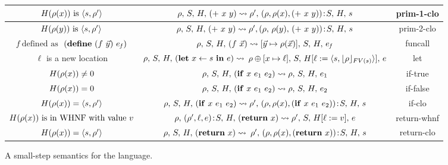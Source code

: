 \documentclass[9pt,preprint,nonatbib]{sigplanconf}
\def\myvec{\mathaccent"017E }
\begin{document}
\begin{figure}[t!]
\begin{center}
\begin{tabular}{|c|c|c|}
$H(\rho(x)) \mbox{ is } \langle s, \rho'\rangle$ & $\rho,\, S,\, H,\, (+~x~y)
\rightsquigarrow
\rho',\, (\rho, \rho(x), (+~x~y))\!:\!S,\, H,\, s$      &
{\sc prim-1-clo} \\
\hline
$H(\rho(y)) \mbox{ is } \langle s, \rho'\rangle $ & $\rho,\, S,\, H,\, (+~x~y)
\rightsquigarrow
\rho', (\rho,\, \rho(y),\, (+~x~y))\!:\!S,\, H,\, s$      &
{\sc prim-2-clo} \\
\hline
{$\mathit{f}~\mbox{defined as}$
$~(\DEFINE~(f~\myvec{y})~e_{\mathit{f}})$}  & $\rho,\, S,\, \heap,\,
(f~\myvec{x})  \rightsquigarrow
[\myvec{y} \mapsto \rho(\myvec{x})],\, S,\, \heap,\, e_{\mathit{f}}$      &
{\sc funcall} \\
\hline
$\ell$ is a new location& {$\rho,\, S,\, H,\, (\mbox{$\mathbf{ let}$}~x\leftarrow s~\mbox{$\mathbf{ in}$}~e)
  \rightsquigarrow$
$\rho\oplus[x \mapsto \ell],\, S,\, \heap[\ell := \langle s,
    \lfloor\rho\rfloor_{FV(s)} %
    \rangle],\, e$} &
{\sc let} \\
\hline
$H(\rho(x)) \ne 0$ & $\rho,\, S,\, H,\, (\mbox{$\mathbf{ if}$}~x~e_1~e_2)   \rightsquigarrow
\rho,\, S,\, H,\,  e_1$ & {\sc if-true} \\
\hline
$H(\rho(x)) = 0$ & $\rho,\, S,\, H,\, (\mbox{$\mathbf{ if}$}~x~e_1~e_2)   \rightsquigarrow
\rho,\, S, \,H, \, e_2$ & {\sc if-false} \\
\hline
$H(\rho(x)) = \langle s, \rho' \rangle $ & {$\rho,\, S,\, H,\,
  (\mbox{$\mathbf{ if}$}~x~e_1~e_2)   \rightsquigarrow
\rho',\, (\rho, \rho(x), (\mbox{$\mathbf{ if}$}~x~e_1~e_2))\!:\!S,\, H, \, s$}
&
{\sc if-clo} \\
\hline
{$H(\rho(x))~\mbox{is in WHNF with value}~v$}& $\rho,\, (\rho', \ell,
e)\!:\!S,\, H,\,
(\mbox{$\mathbf{ return}$}~x)  \rightsquigarrow \rho',\, S,\, H[\ell := v],\, e$ &
{\sc return-whnf}\\
\hline
$H(\rho(x)) = \langle s, \rho' \rangle $ & {$\rho,\, S,\, H,\, (\mbox{$\mathbf{ return}$}~x)
  \rightsquigarrow$
$\rho',\, (\rho, \rho(x), (\mbox{$\mathbf{ return}$}~x))\!:\!S,\, H,\,  s$} &
{\sc return-clo} \\
\hline
\end{tabular}
\caption{A small-step semantics for the language. \label{fig:lang-semantics}}
\end{center}
\end{figure}
\end{document}
